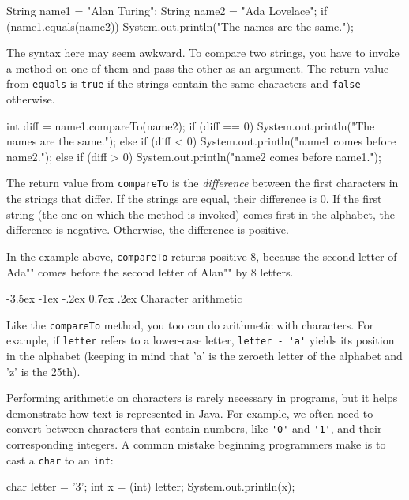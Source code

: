 \documentclass[12pt]{book}
\makeatletter
\theoremstyle{exercise}
\newcommand{\java}[1]{\verb"#1"}
\renewcommand{\section}{\@startsection{section}{1}{\z@}%
    {-3.5ex \@plus -1ex \@minus -.2ex}%
    {0.7ex \@plus.2ex}%
    {\normalfont\Large\bfseries}}
\newcommand{\java}[1]{\lstinline{#1}} %
\makeatother
\begin{document}
\begin{code}
    String name1 = "Alan Turing";
    String name2 = "Ada Lovelace";
    if (name1.equals(name2)) {
        System.out.println("The names are the same.");
    }
\end{code}

The syntax here may seem awkward.
To compare two strings, you have to invoke a method on one of them and pass the other as an argument.
The return value from \java{equals} is \java{true} if the strings contain the same characters and \java{false} otherwise.

\begin{code}
    int diff = name1.compareTo(name2);
    if (diff == 0) {
        System.out.println("The names are the same.");
    } else if (diff < 0) {
        System.out.println("name1 comes before name2.");
    } else if (diff > 0) {
        System.out.println("name2 comes before name1.");
    }
\end{code}

The return value from \java{compareTo} is the {\em difference} between the first characters in the strings that differ.
If the strings are equal, their difference is 0.
If the first string (the one on which the method is invoked) comes first in the alphabet, the difference is negative.
Otherwise, the difference is positive.

In the example above, \java{compareTo} returns positive 8, because the second letter of \java{"Ada"} comes before the second letter of \java{"Alan"} by 8 letters.


\section{Character arithmetic}

Like the \java{compareTo} method, you too can do arithmetic with characters.
For example, if \java{letter} refers to a lower-case letter, \java{letter - 'a'} yields its position in the alphabet (keeping in mind that 'a' is the zeroeth letter of the alphabet and 'z' is the 25th).

Performing arithmetic on characters is rarely necessary in programs, but it helps demonstrate how text is represented in Java.
For example, we often need to convert between characters that contain numbers, like \java{'0'} and \java{'1'}, and their corresponding integers.
A common mistake beginning programmers make is to cast a \java{char} to an \java{int}:

\begin{code}
    char letter = '3';
    int x = (int) letter;
    System.out.println(x);
\end{code}
\end{document}
